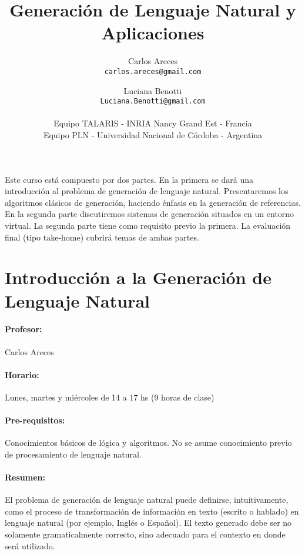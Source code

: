 \documentclass[a4paper]{article}
\begin{document}
\setcounter{page}{1}

\title{Generaci\'on de Lenguaje Natural y Aplicaciones}
\author{Carlos Areces\\
  {\tt carlos.areces@gmail.com} 
\and 
Luciana Benotti\\
  {\tt Luciana.Benotti@gmail.com} \\
 \ \\
  Equipo TALARIS - INRIA Nancy Grand Est - Francia\\
  Equipo PLN - Universidad Nacional de C\'ordoba - Argentina
}

\date{}

\maketitle

Este curso est\'a compuesto por dos partes. En la primera se dar\'a una introducci\'on al problema de generaci\'on de lenguaje natural. Presentaremos los algoritmos cl\'asicos de generaci\'on, haciendo \'enfasis en la generaci\'on de referencias. En la segunda parte discutiremos sistemas de generaci\'on situados en un entorno virtual.
La segunda parte tiene como requisito previo la primera. La evaluaci\'on final (tipo take-home) cubrir\'a temas de ambas partes.

\section{Introducci\'on a la Generaci\'on de Lenguaje Natural}

\paragraph{Profesor:} Carlos Areces %

\paragraph{Horario:} Lunes, martes y mi\'ercoles de 14 a 17 hs (9 horas de clase)

\paragraph{Pre-requisitos:} Conocimientos b\'asicos de l\'ogica y algoritmos. No se asume conocimiento previo de procesamiento de lenguaje natural.

\paragraph{Resumen:} El problema de generaci\'on de lenguaje natural puede definirse, intuitivamente, como el proceso de transformaci\'on de informaci\'on en texto (escrito o hablado) en lenguaje natural (por ejemplo, Ingl\'es o Espa\~{n}ol). El texto generado debe ser no solamente gramaticalmente correcto, sino adecuado para el contexto en donde ser\'a utilizado.
\end{document}
